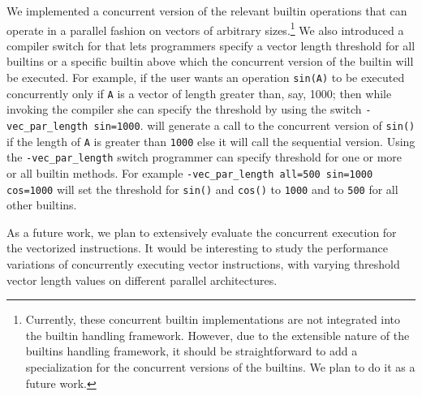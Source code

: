 We implemented a concurrent version of the relevant builtin operations that can
operate in a parallel fashion on vectors of arbitrary sizes.\footnote{Currently,
these concurrent builtin implementations are not integrated into the builtin
handling framework. However, due to the extensible nature of the builtins
handling framework, it should be straightforward to add a specialization for the
concurrent versions of the builtins. We plan to do it as a future work.} We also
introduced a compiler switch for \mixten that lets programmers specify a
vector length threshold for all builtins or a specific builtin above
which the concurrent version of the builtin will be executed. For
example, if the user wants an operation \verb|sin(A)| to be executed
concurrently only if \verb|A| is a vector of length greater than, say,
1000; then while invoking the \mixten compiler she can specify the
threshold by using the switch \verb|-vec_par_length sin=1000|. \mixten
will generate a call to the concurrent version of \verb|sin()| if the
length of \verb|A| is greater than \verb|1000| else it will call the
sequential version. Using the \verb|-vec_par_length| switch programmer
can specify threshold for one or more or all builtin methods. For
example \verb|-vec_par_length all=500 sin=1000 cos=1000| will set the
threshold for \verb|sin()| and \verb|cos()| to \verb|1000| and to
\verb|500| for all other builtins. 

As a future work, we plan to extensively evaluate the concurrent execution for
the vectorized instructions. It would be interesting to study the performance 
variations of concurrently executing vector instructions, with varying
threshold vector length values on different parallel architectures.   



